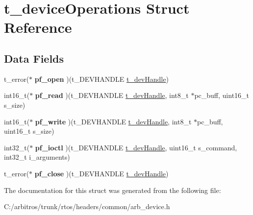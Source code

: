 \hypertarget{structt__device_operations}{\section{t\-\_\-device\-Operations Struct Reference}
\label{structt__device_operations}
}
\subsection*{Data Fields}
\begin{DoxyCompactItemize}
\item 
\hypertarget{structt__device_operations_a608aaa9edd7f339d70df7bf7e8290041}{t\-\_\-error($\ast$ {\bfseries pf\-\_\-open} )(t\-\_\-\-D\-E\-V\-H\-A\-N\-D\-L\-E \hyperlink{structt__dev_handle}{t\-\_\-dev\-Handle})}\label{structt__device_operations_a608aaa9edd7f339d70df7bf7e8290041}

\item 
\hypertarget{structt__device_operations_a6ac8ee34b9e26013d6cff8239fb8d9cf}{int16\-\_\-t($\ast$ {\bfseries pf\-\_\-read} )(t\-\_\-\-D\-E\-V\-H\-A\-N\-D\-L\-E \hyperlink{structt__dev_handle}{t\-\_\-dev\-Handle}, int8\-\_\-t $\ast$pc\-\_\-buff, uint16\-\_\-t s\-\_\-size)}\label{structt__device_operations_a6ac8ee34b9e26013d6cff8239fb8d9cf}

\item 
\hypertarget{structt__device_operations_a4b6fd244d6ba3ca505decc7abd6ca694}{int16\-\_\-t($\ast$ {\bfseries pf\-\_\-write} )(t\-\_\-\-D\-E\-V\-H\-A\-N\-D\-L\-E \hyperlink{structt__dev_handle}{t\-\_\-dev\-Handle}, int8\-\_\-t $\ast$pc\-\_\-buff, uint16\-\_\-t s\-\_\-size)}\label{structt__device_operations_a4b6fd244d6ba3ca505decc7abd6ca694}

\item 
\hypertarget{structt__device_operations_a6fb0091a25b55629520172fe3d09c36b}{int32\-\_\-t($\ast$ {\bfseries pf\-\_\-ioctl} )(t\-\_\-\-D\-E\-V\-H\-A\-N\-D\-L\-E \hyperlink{structt__dev_handle}{t\-\_\-dev\-Handle}, uint16\-\_\-t s\-\_\-command, int32\-\_\-t i\-\_\-arguments)}\label{structt__device_operations_a6fb0091a25b55629520172fe3d09c36b}

\item 
\hypertarget{structt__device_operations_af7309283442f6002dc583cdbd6ff8c58}{t\-\_\-error($\ast$ {\bfseries pf\-\_\-close} )(t\-\_\-\-D\-E\-V\-H\-A\-N\-D\-L\-E \hyperlink{structt__dev_handle}{t\-\_\-dev\-Handle})}\label{structt__device_operations_af7309283442f6002dc583cdbd6ff8c58}

\end{DoxyCompactItemize}


The documentation for this struct was generated from the following file\-:\begin{DoxyCompactItemize}
\item 
C\-:/arbitros/trunk/rtos/headers/common/arb\-\_\-device.\-h\end{DoxyCompactItemize}
